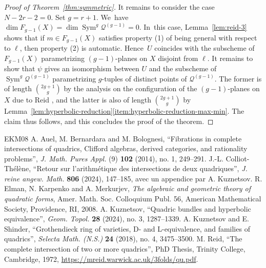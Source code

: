 \documentclass[10pt,a4paper]{amsart}
\theoremstyle{plain}
\theoremstyle{definition}
\DeclareMathOperator{\Sym}{Sym}
\begin{document}
\begin{proof}[Proof of Theorem~\ref{thm:symmetric}]
It remains to consider the case $N-2r-2=0$. Set $g=r+1$. We~have $\dim F_{g-1}(X)=\dim \Sym^{g}\mathcal{Q}^{(g-1)}=0$. In~this case, Lemma~\ref{lem:reid-3} shows that if $m\in F_{g-1}(X)$ satisfies property (1) of being general with respect to \(\ell\), then property (2) is automatic.
Hence~$U$ coincides with the subscheme of $F_{g-1}(X)$ parametrizing $(g-1)$-planes on $X$ disjoint from $\ell$.
It remains to show that $\psi$ gives an isomorphism between $U$ and the subscheme of $\Sym^{g}\mathcal{Q}^{(g-1)}$ parametrizing $g$-tuples of distinct points of $\mathcal{Q}^{(g-1)}$.
The former is of length $\binom{2g+1}{g}$ by the analysis on the configuration of the $(g-1)$-planes on $X$ due to Reid \cite[Th.\,3.8]{Reid-thesis},
and the latter is also of length $\binom{2g+1}{g}$
by Lemma~\ref{lem:hyperbolic-reduction}\eqref{item:hyperbolic-reduction-max-min}. The claim thus follows, and this concludes the proof of the theorem.
\end{proof}

\begin{thebibliography}{EKM08}
 A. Auel, M. Bernardara and M. Bolognesi, ``Fibrations in complete intersections of quadrics, Clifford algebras, derived categories, and rationality problems'', \emph{J. Math. Pures Appl.} (9) \textbf{102} (2014), no. 1, 249--291.
 J.-L. Colliot-Th\'el\`ene, ``Retour sur l'arithm\'etique des intersections de deux quadriques'', \emph{J. reine angew. Math.} \textbf{806} (2024), 147--185, avec un appendice par A. Kuznetsov.
 R. Elman, N. Karpenko and A. Merkurjev, \emph{The algebraic and geometric theory of quadratic forms}, Amer. Math. Soc. Colloquium Publ. 56, American Mathematical Society, Providence, RI, 2008.
 A. Kuznetsov, ``Quadric bundles and hyperbolic equivalence'', \emph{Geom. Topol.} \textbf{28} (2024), no. 3, 1287--1339.
 A. Kuznetsov and E. Shinder, ``Grothendieck ring of varieties, D- and L-equivalence, and families of quadrics'', \emph{Selecta Math. (N.S.)} \textbf{24} (2018), no. 4, 3475--3500.
 M. Reid, ``The complete intersection of two or more quadrics'', PhD Thesis, Trinity College, Cambridge, 1972, \url{https://mreid.warwick.ac.uk/3folds/qu.pdf}.
\end{thebibliography}
\end{document}
